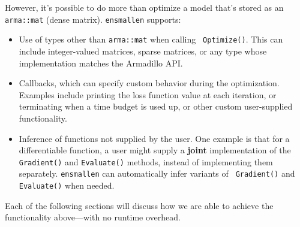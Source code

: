 However, it's possible to do more than optimize a model that's stored as an {\tt
\small arma::mat} (dense matrix).  {\tt ensmallen} supports:

\begin{itemize}
  \item Use of types other than {\tt \small arma::mat} when calling {\tt \small
Optimize()}.  This can include integer-valued matrices, sparse matrices, or any
type whose implementation matches the Armadillo API.

  \item Callbacks, which can specify custom behavior during the optimization.
Examples include printing the loss function value at each iteration, or
terminating when a time budget is used up, or other custom user-supplied
functionality.

  \item Inference of functions not supplied by the user.  One example is that
for a differentiable function, a user might supply a {\bf joint} implementation
of the {\tt Gradient()} and {\tt Evaluate()} methods, instead of implementing
them separately.  {\tt ensmallen} can automatically infer variants of {\tt
Gradient()} and {\tt Evaluate()} when needed.
\end{itemize}

Each of the following sections will discuss how we are able to achieve the
functionality above---with no runtime overhead.
